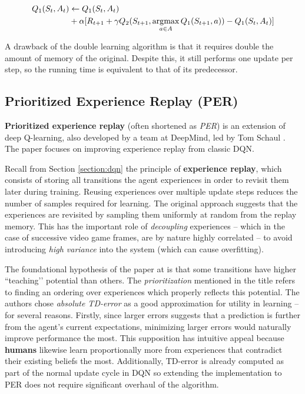 \begin{equation} \label{eqn:double-learning-rule}
\begin{aligned}
Q_1(S_t, A_t) & \leftarrow Q_1(S_t, A_t) \\
    & + \alpha [ R_{t+1} + \gamma Q_2(S_{t+1}, \operatorname*{\arg\!\max}_{a \in A} Q_1(S_{t+1}, a)) - Q_1(S_t, A_t)]
\end{aligned}
\end{equation}

A drawback of the double learning algorithm is that it requires double the amount of memory of the original. 
Despite this, it still performs one update per step, so the running time is equivalent to that of its predecessor.

\subsection{Prioritized Experience Replay (PER)} \label{section:per}
\textbf{Prioritized experience replay} (often shortened as \emph{PER}) is an extension of deep Q-learning, also developed by a team at DeepMind, led by Tom Schaul \cite{per-paper}.
The paper focuses on improving experience replay from classic DQN.

Recall from Section \ref{section:dqn} the principle of \textbf{experience replay}, which consists of storing all transitions the agent experiences in order to revisit them later during training.
Reusing experiences over multiple update steps reduces the number of samples required for learning.
The original approach suggests that the experiences are revisited by sampling them uniformly at random from the replay memory.
This has the important role of \emph{decoupling} experiences -- which in the case of successive video game frames, are by nature highly correlated -- to avoid introducing \emph{high variance} into the system (which can cause overfitting).

The foundational hypothesis of the paper at \cite{per-paper} is that some transitions have higher ``teaching’’ potential than others.
The \emph{prioritization} mentioned in the title refers to finding an ordering over experiences which properly reflects this potential.
The authors chose \emph{absolute TD-error} as a good approximation for utility in learning -- for several reasons.
Firstly, since larger errors suggests that a prediction is further from the agent’s current expectations, minimizing larger errors would naturally improve performance the most.
This supposition has intuitive appeal because \textbf{humans} likewise learn proportionally more from experiences that contradict their existing beliefs the most.
Additionally, TD-error is already computed as part of the normal update cycle in DQN so extending the implementation to PER does not require significant overhaul of the algorithm.

